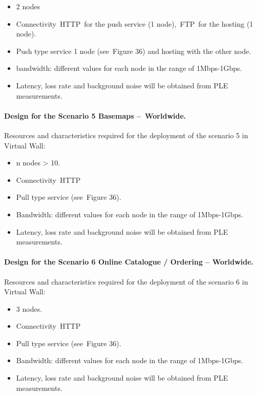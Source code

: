 \documentclass[a4paper]{article}
\newcommand\liststyleLFOxl{%
\renewcommand\labelitemi{[F0B7?]}
\renewcommand\labelitemii{o}
\renewcommand\labelitemiii{[F0A7?]}
\renewcommand\labelitemiv{[F0B7?]}
}
\begin{document}
\liststyleLFOxl
\begin{itemize}
\item 2 nodes
\item Connectivity\ HTTP\ for the push service (1 node),\ FTP\ for the
hosting (1 node).
\item Push type service 1 node (see\ Figure 36) and hosting with the
other node.
\item bandwidth: different values for each node in the range of
1Mbps-1Gbps.
\item Latency, loss rate and background noise will be obtained from PLE
measurements.
\end{itemize}
\paragraph[Design for the Scenario 5 Basemaps {}--\ Worldwide.]{Design
for the Scenario 5 Basemaps --\ Worldwide.}

\bigskip

Resources and characteristics required for the deployment of the
scenario 5 in Virtual Wall:\ 

\liststyleLFOxl
\begin{itemize}
\item n nodes {\textgreater} 10.
\item Connectivity\ HTTP
\item Pull type service (see\ Figure 36).
\item Bandwidth: different values for each node in the range of
1Mbps-1Gbps.
\item Latency, loss rate and background noise will be obtained from PLE
measurements.
\end{itemize}
\paragraph[Design for the Scenario 6 Online Catalogue / Ordering {}--
Worldwide.]{Design for the Scenario 6 Online Catalogue / Ordering --
Worldwide.}

\bigskip

Resources and characteristics required for the deployment of the
scenario 6 in Virtual Wall:\ 

\liststyleLFOxl
\begin{itemize}
\item 3 nodes.
\item Connectivity\ HTTP
\item Pull type service (see\ Figure 36).
\item Bandwidth: different values for each node in the range of
1Mbps-1Gbps.
\item Latency, loss rate and background noise will be obtained from PLE
measurements.
\end{itemize}
\end{document}
